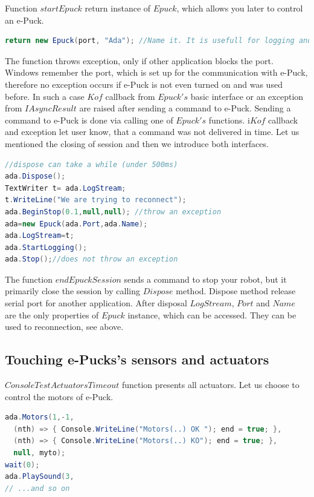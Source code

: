   Function $startEpuck$ return instance of $Epuck$, which allows you later to control an e-Puck.
\begin{lstlisting}[language=cs]
return new Epuck(port, "Ada"); //Name it. It is usefull for logging and debugging.
\end{lstlisting}
  The function throws exception, only if other application blocks the port. Windows remember
  the port, which is set up for the communication with e-Puck, therefore
  no exception occurs if e-Puck is not even turned on and was used before.
  In such a case $Kof$ callback from $Epuck's$ basic interface or an exception	
  from $IAsyncResult$ are raised after sending a command to e-Puck.
  Sending a command to e-Puck is done via calling one of $Epuck's$ functions.
  i$Kof$ callback and exception let user know, that a command was not delivered in time.
  Let us mentioned the closing of session and then we introduce both interfaces.
\begin{lstlisting}[language=cs]
//dispose can take a while (under 500ms)
ada.Dispose();
TextWriter t= ada.LogStream;
t.WriteLine("We are trying to reconnect");
ada.BeginStop(0.1,null,null); //throw an exception
ada=new Epuck(ada.Port,ada.Name);
ada.LogStream=t;
ada.StartLogging();
ada.Stop();//does not throw an exception
\end{lstlisting}
  The function $endEpuckSession$ sends a command to stop your robot, but it primarily close the session by calling $Dispose$ method.
  Dispose method release serial port for another application. After disposal $LogStream$, $Port$ and $Name$ are the 
  only properties of $Epuck$ instance, which can be accessed. They can be used to reconnection, see above.

\subsection{Touching e-Pucks's sensors and actuators}\label{sec:touching}
  $ConsoleTestActuatorsTimeout$ function presents all actuators. Let us choose to control the motors of e-Puck.
\begin{lstlisting}[language=cs]
ada.Motors(1,-1,
  (nth) => { Console.WriteLine("Motors(..) OK "); end = true; },
  (nth) => { Console.WriteLine("Motors(..) KO"); end = true; },
  null, myto);
wait(0);
ada.PlaySound(3,
// ...and so on
\end{lstlisting}
  
